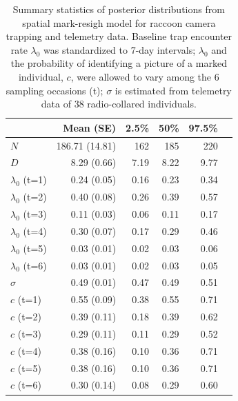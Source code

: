 \begin{table}%
\centering
\caption{Summary statistics of posterior distributions
from spatial mark-resigh model for raccoon camera trapping and telemetry data. Baseline trap encounter rate $\lambda_0$ was standardized to 7-day intervals; $\lambda_0$ and the probability of identifying a picture of a marked individual, $c$, were allowed to vary among the 6 sampling occasions (t); $\sigma$ is estimated from telemetry data of 38 radio-collared individuals.}
\begin{tabular}{lrrrrr}
\hline
   &	Mean (SE) &	2.5\% &	50\%	& 97.5\% \\
 \hline
$N$	& 186.71 (14.81) & 162 & 185	& 220 \\
$D$	& 8.29 (0.66)	& 7.19	& 8.22	& 9.77 \\
$\lambda_0$ (t=1)	& 0.24 (0.05) & 0.16 & 0.23 & 0.34 \\
$\lambda_0$ (t=2)	& 0.40 (0.08)	& 0.26	& 0.39	& 0.57 \\
$\lambda_0$ (t=3)	& 0.11 (0.03) & 0.06 & 0.11	& 0.17 \\
$\lambda_0$ (t=4)	& 0.30 (0.07)	& 0.17	& 0.29	& 0.46 \\
$\lambda_0$ (t=5)	& 0.03 (0.01)	& 0.02	& 0.03	& 0.06 \\
$\lambda_0$ (t=6)	& 0.03 (0.01)	& 0.02	& 0.03	& 0.05 \\
$\sigma$	& 0.49 (0.01)	& 0.47	& 0.49	& 0.51 \\
$c$ (t=1)	& 0.55 (0.09)	& 0.38	& 0.55	& 0.71 \\
$c$ (t=2)	& 0.39 (0.11)	& 0.18	& 0.39	& 0.62 \\
$c$ (t=3)	& 0.29 (0.11) & 0.11	& 0.29	& 0.52 \\
$c$ (t=4)	& 0.38 (0.16)	& 0.10	& 0.36	& 0.71 \\
$c$ (t=5)	& 0.38 (0.16)	& 0.10	& 0.36	& 0.71 \\
$c$ (t=6)	& 0.30 (0.14)	& 0.08	& 0.29	& 0.60 \\
 \hline
\end{tabular}
\label{partialID.tab.raccoons}
\end{table}

